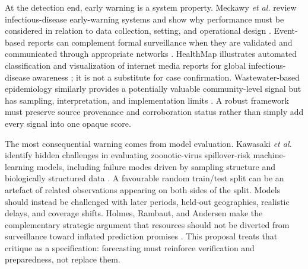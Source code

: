 \documentclass[conference]{IEEEtran}
\begin{document}
At the detection end, early warning is a system property. Meckawy \emph{et al.} review infectious-disease early-warning systems and show why performance must be considered in relation to data collection, setting, and operational design \cite{meckawy2022}. Event-based reports can complement formal surveillance when they are validated and communicated through appropriate networks \cite{keller2009}. HealthMap illustrates automated classification and visualization of internet media reports for global infectious-disease awareness \cite{freifeld2008}; it is not a substitute for case confirmation. Wastewater-based epidemiology similarly provides a potentially valuable community-level signal but has sampling, interpretation, and implementation limits \cite{polo2020}. A robust framework must preserve source provenance and corroboration status rather than simply add every signal into one opaque score.

The most consequential warning comes from model evaluation. Kawasaki \emph{et al.} identify hidden challenges in evaluating zoonotic-virus spillover-risk machine-learning models, including failure modes driven by sampling structure and biologically structured data \cite{kawasaki2025}. A favourable random train/test split can be an artefact of related observations appearing on both sides of the split. Models should instead be challenged with later periods, held-out geographies, realistic delays, and coverage shifts. Holmes, Rambaut, and Andersen make the complementary strategic argument that resources should not be diverted from surveillance toward inflated prediction promises \cite{holmes2018}. This proposal treats that critique as a specification: forecasting must reinforce verification and preparedness, not replace them.
\end{document}
